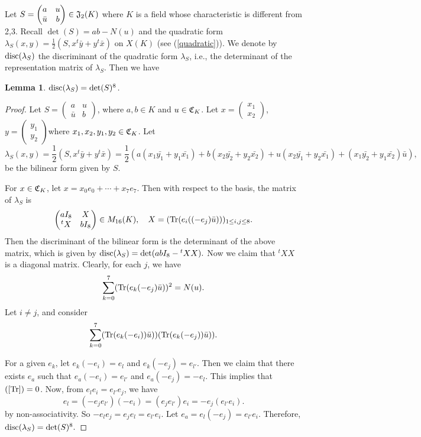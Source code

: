 \documentclass[11pt]{amsart}
\numberwithin{equation}{section}
\newtheorem{lemma}[theorem]{Lemma}
\theoremstyle{definition}
\begin{document}
Let $S=\begin{pmatrix} a&u\\ \bar u&b\end{pmatrix}\in \frak J_2(K)$ where $K$ is a field whose characteristic is different from 2,3. 
Recall $\det(S)=ab-N(u)$ and the quadratic form $\lambda_S(x,y)=\frac{1}{2}(S,x{}^t\bar{y}+y{}^t\bar{x})$ on $X(K)$ (see (\ref{quadratic})). 
We denote by ${{\rm disc}}(\lambda_S)$ the discriminant of the quadratic form $\lambda_S$, i.e.,
the determinant of the representation matrix of $\lambda_S$. 
Then we have 
\begin{lemma}\label{det} ${\rm disc}(\lambda_S)=\det(S)^8$.
\end{lemma}
\begin{proof}
Let $S=\begin{pmatrix} a&u\\ \bar u&b\end{pmatrix}$, where $a,b\in K$ and $u\in \frak C_K$.
Let $x=\begin{pmatrix} x_1\\ x_2\end{pmatrix}$, $y=\begin{pmatrix} y_1\\ y_2\end{pmatrix}$where $x_1,x_2, y_1,y_2\in 
\frak C_K$.
Let 
$$\lambda_S(x,y)=\frac{1}{2}(S, x {}^t \bar y+y {}^t \bar x)=\frac 12( a(x_1 \bar{y_1}+y_1\bar{x_1})+b(x_2\bar{y_2}+y_2\bar{x_2})
+u( x_2\bar{y_1}+y_2\bar{x_1})+(x_1\bar{y_2}+y_1\bar{x_2})\bar u),
$$
be the bilinear form given by $S$.

For $x\in \frak C_K$, let $x=x_0e_0+\cdots+x_7e_7$. Then with respect to the basis, the matrix of $\lambda_S$ is
$$\begin{pmatrix} aI_8 &X\\ {}^t X& bI_8\end{pmatrix}\in M_{16}(K), \quad X=({\rm Tr}(e_i ((-e_j)\bar u)))_{1\le i,j\le 8}.
$$
Then the discriminant of the bilinear form is the determinant of the above matrix, which is given by
${\rm disc}(\lambda_S)=\det(ab I_8-{}^t X X).$
Now we claim that ${}^t XX$ is a diagonal matrix. Clearly, for each $j$, we have 
$$\sum_{k=0}^7 ({\rm Tr}(e_k(-e_j)\bar u))^2=N(u).
$$
Let $i\ne j$, and consider
\begin{equation}\label{Tr}
\sum_{k=0}^7 ({\rm Tr}(e_k (-e_i))\bar u))({\rm Tr}(e_k (-e_j))\bar u)).
\end{equation}

For a given $e_k$, let $e_k (-e_i)=e_l$ and $e_k (-e_j)=e_{l'}$. Then we claim that
there exists $e_a$ such that $e_a(-e_i)=e_{l'}$ and $e_a(-e_j)=-e_l$. This implies that $(\ref{Tr})=0$. 
Now, from $e_le_i=e_{l'}e_j$, we have
$$e_l=(-e_je_{l'})(-e_i)=(e_je_{l'})e_i=-e_j(e_{l'}e_i).
$$
by non-associativity. So $-e_le_j=e_je_l=e_{l'}e_i$. Let $e_a=e_l(-e_j)=e_{l'}e_i$.
Therefore, 
${{\rm disc}}(\lambda_S)=\det(S)^8.$
\end{proof}
\end{document}
